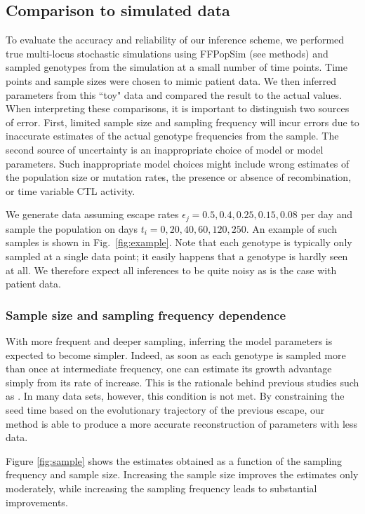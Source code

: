 \documentclass{frontiers}
\newcommand{\FIG}[1]{Fig.~\ref{fig:#1}}
\newcommand{\fcoeff}{\epsilon}
\begin{document}
\subsection{Comparison to simulated data}
To evaluate the accuracy and reliability of our inference scheme, we
performed true multi-locus stochastic simulations using FFPopSim (see
methods) and sampled genotypes from the simulation at a small number of
time points. Time points and sample sizes were chosen to mimic patient
data. We then inferred parameters from this ``toy" data and compared the
result to the actual values. When interpreting these comparisons, it is
important to distinguish two sources of error.  First, limited sample
size and sampling frequency will incur errors due to inaccurate
estimates of the actual genotype frequencies from the sample. The second
source of uncertainty is an inappropriate choice of model or model
parameters. Such inappropriate model choices might include wrong
estimates of the population size or mutation rates, the presence or
absence of recombination, or time variable CTL activity.

We generate data assuming escape rates $\fcoeff_j = 0.5, 0.4,  0.25,
0.15, 0.08$ per day and sample the population on days $t_i=0,20,40,60,120,250$. An
example of such samples is shown in \FIG{example}. Note that each genotype
is typically only sampled at a single data point; it easily happens that
a genotype is hardly seen at all. We therefore expect all inferences to be quite
noisy as is the case with patient data.

\subsubsection{Sample size and sampling frequency dependence} 
With more frequent and deeper sampling, inferring the model parameters is
expected to become simpler. Indeed, as soon as each genotype is sampled more than
once at intermediate frequency, one can estimate its growth advantage simply
from its rate of increase. This is the rationale behind previous studies such as
\citep{ganusov_fitness_2011,Asquith:2006p28003}. In many data sets, however, this
condition is not met. By constraining the seed time based on the evolutionary
trajectory of the previous escape, our method is able to produce a more accurate
reconstruction of parameters with less data. 


Figure \ref{fig:sample} shows the estimates obtained as a function of the sampling
frequency and sample size. Increasing the sample size improves the estimates
only moderately, while increasing the sampling frequency leads to substantial
improvements.
\end{document}
